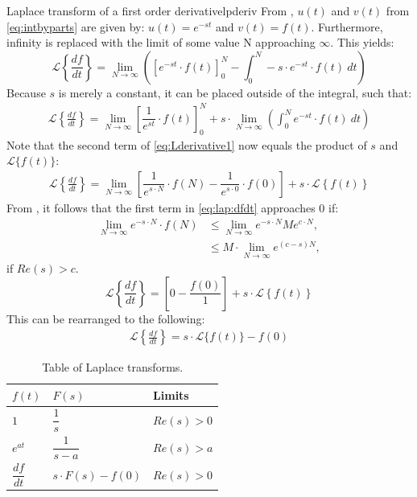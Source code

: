 \begin{prof}{Laplace transform of a first order derivative}{lpderiv}
From , $u(t)$ and $v(t)$ from \eqref{eq:intbyparts} are given by: $u(t) = e^{-st}$ and $v(t) = f(t)$. Furthermore, infinity is replaced with the limit of some value N approaching $\infty$. This yields:
$$\mathcal{L} \left\{\frac{df}{dt} \right\}=\lim_{N \to \infty} \left(\left[e^{-st}\cdot f(t)\right]_{0}^{N}-\int_{0}^{N} -s\cdot e^{-st}\cdot f(t)\ dt \right)$$
Because $s$ is merely a constant, it can be placed outside of the integral, such that:
\begin{align}
\mathcal{L} \left\{\frac{df}{dt} \right\}=\lim_{N \to \infty} \left[\dfrac{1}{e^{st}}\cdot f(t)\right]_{0}^{N}+ s \cdot \lim_{N \to \infty} \left( \int_{0}^{N}e^{-st}\cdot f(t)\ dt \right)\label{eq:Lderivative1}
\end{align}
Note that the second term of \eqref{eq:Lderivative1} now equals the product of $s$ and $\mathcal{L}\{f(t)\}$:
\begin{align}
\mathcal{L} \left\{\frac{df}{dt} \right\} = \lim_{N \to \infty}\left[\dfrac{1}{e^{s\cdot N}}\cdot f(N)-\dfrac{1}{e^{s\cdot 0}}\cdot f(0)\right]+s\cdot \mathcal{L} \left\{f(t) \right\} \label{eq:lap:dfdt}
\end{align}
From , it follows that the first term in \eqref{eq:lap:dfdt} approaches $0$ if:
\begin{align*}
\lim_{N \to \infty} e^{-s\cdot N}\cdot f(N) &\leq \lim_{N \to \infty} e^{-s\cdot N} Me^{c\cdot N},\\
&\leq M \cdot \lim_{N \to \infty} e^{(c-s)N},
\end{align*}
if $Re(s) > c$.
$$\mathcal{L} \left\{\frac{df}{dt} \right\} = \left[0-\dfrac{f(0)}{1}\right]+s\cdot \mathcal{L} \left\{f(t) \right\}$$
This can be rearranged to the following:
\begin{align*}
\mathcal{L} \left\{\frac{df}{dt} \right\} = s\cdot \mathcal{L}\{f(t)\}-f(0)
\end{align*}

\end{prof}
\begin{table}[H]
\center
\begin{tabular}{lll}
\hline
\multicolumn{1}{|l|}{$f(t)$}           & \multicolumn{1}{l|}{$F(s)$}                & \multicolumn{1}{l|}{Limits}    \\ \hline
\multicolumn{1}{|l|}{$1$}              & \multicolumn{1}{l|}{$\dfrac{1}{s}$}        & \multicolumn{1}{l|}{$Re(s)>0$} \\ \hline
\multicolumn{1}{|l|}{$e^{at}$}         & \multicolumn{1}{l|}{$\dfrac{1}{s-a}$}      & \multicolumn{1}{l|}{$Re(s)>a$} \\ \hline
\multicolumn{1}{|l|}{$\dfrac{df}{dt}$} & \multicolumn{1}{l|}{$s \cdot F(s) - f(0)$} & \multicolumn{1}{l|}{$Re(s)>0$} \\ \hline                          
\end{tabular}
\caption{Table of Laplace transforms.}
\label{lptable}
\end{table}
